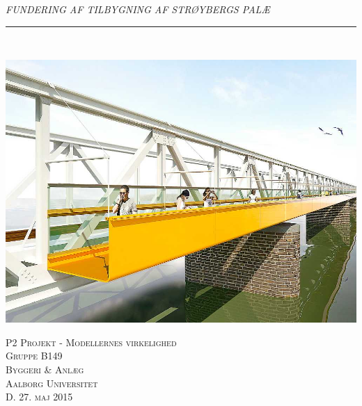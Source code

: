 \thispagestyle{empty}
\begin{flushright}
\vspace{3cm}

\phantom{hul}

\phantom{hul}

\phantom{hul}

\textsl{\Huge FUNDERING AF TILBYGNING AF STRØYBERGS PALÆ} \\ \vspace{1cm}

\rule{13cm}{3mm} \\ \vspace{1.5cm}
\vspace{1cm}

\includegraphics[width=1.0\textwidth]{billeder/forside.jpg}

\vspace{2cm} 
\textsc{\Large P2 Projekt - Modellernes virkelighed \\
Gruppe B149 \\
Byggeri \& Anlæg\\
Aalborg Universitet\\
D. 27. maj 2015\\}
\end{flushright}

